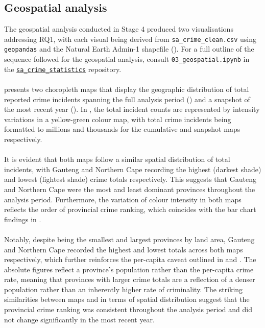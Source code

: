 \documentclass[titlepage, 12pt, oneside]{article}
\numberwithin{equation}{section}
\begin{document}
	\subsection{Geospatial analysis}
	The geospatial analysis conducted in Stage 4 produced two visualisations addressing RQ1, with each visual being derived from \texttt{sa{\_}crime{\_}clean.csv} using \texttt{geopandas} and the Natural Earth Admin-1 shapefile (\cite{naturalearth}). For a full outline of the sequence followed for the geospatial analysis, consult \texttt{03{\_}geospatial.ipynb} in the \href{https://github.com/joshua-pillay/sa-crime-statistics}{\texttt{sa{\_}crime{\_}statistics}} repository. \\\\
	 presents two choropleth maps that display the geographic distribution of total reported crime incidents spanning the full analysis period () and a snapshot of the most recent year (). In , the total incident counts are represented by intensity variations in a yellow-green colour map, with total crime incidents being formatted to millions and thousands for the cumulative and snapshot maps respectively. \\\\
	It is evident that both maps follow a similar spatial distribution of total incidents, with Gauteng and Northern Cape recording the highest (darkest shade) and lowest (lightest shade) crime totals respectively. This suggests that Gauteng and Northern Cape were the most and least dominant provinces throughout the analysis period. Furthermore, the variation of colour intensity in both maps reflects the order of provincial crime ranking, which coincides with the bar chart findings in .\\\\ Notably, despite being the smallest and largest provinces by land area, Gauteng and Northern Cape recorded the highest and lowest totals across both maps respectively, which further reinforces the per-capita caveat outlined in  and . The absolute figures reflect a province's population rather than the per-capita crime rate, meaning that provinces with larger crime totals are a reflection of a denser population rather than an inherently higher rate of criminality. The striking similarities between maps  and  in terms of spatial distribution suggest that the provincial crime ranking was consistent throughout the analysis period and did not change significantly in the most recent year. 
	
\end{document}
